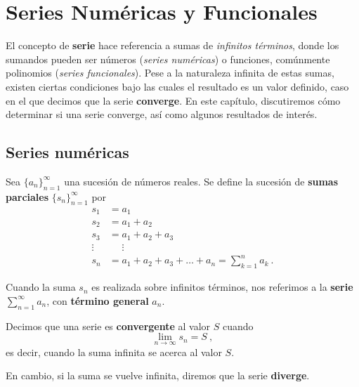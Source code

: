 \chapter{Series Numéricas y Funcionales}

El concepto de \textbf{serie} hace referencia a sumas de \emph{infinitos términos}, donde los sumandos pueden ser números (\emph{series numéricas}) o funciones, comúnmente polinomios (\emph{series funcionales}). Pese a la naturaleza infinita de estas sumas, existen ciertas condiciones bajo las cuales el resultado es un valor definido, caso en el que decimos que la serie \textbf{converge}. En este capítulo, discutiremos cómo determinar si una serie converge, así como algunos resultados de interés.

\section{Series numéricas}

\begin{defi} 
    Sea $\{ a_n \}_{n=1}^\infty$ una sucesión de números reales. Se define la sucesión de \textbf{sumas parciales} $\{s_n\}_{n=1}^\infty$ por 
    \begin{align*}
        s_1 & = a_1 \\
        s_2 & = a_1 + a_2 \\
        s_3 & = a_1 + a_2 + a_3 \\
        \vdots & \phantom{=} \vdots \\
        s_n & = a_1 + a_2 + a_3 + \dots + a_n  = \sum_{k=1}^n a_k \ .
    \end{align*}

    Cuando la suma $s_n$ es realizada sobre infinitos términos, nos referimos a la \textbf{serie} $\sum\limits_{n=1}^\infty a_n$, con \textbf{término general} $a_n$.
\end{defi}

\begin{defi} 
    Decimos que una serie es \textbf{convergente} al valor $S$ cuando
    \begin{equation}
        \lim_{n \to \infty} s_n = S \ ,
    \end{equation}
    es decir, cuando la suma infinita se acerca al valor $S$.

    En cambio, si la suma se vuelve infinita, diremos que la serie \textbf{diverge}.
\end{defi}

